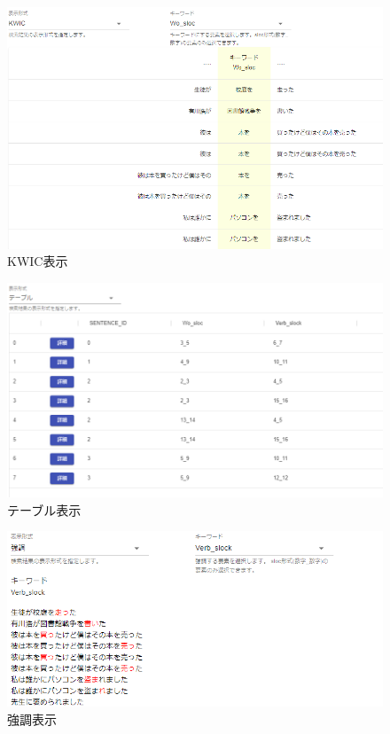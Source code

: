 \documentclass{FITpaper}
\begin{document}
\begin{figure}[htbp]
  \centering
  \includegraphics[scale=0.4]{fig/KWIC_result.png}
  \caption{KWIC表示}
  \label{fig:KWIC}
\end{figure}
\begin{figure}[htbp]
  \centering
  \includegraphics[scale=0.4]{fig/table_result.png}
  \caption{テーブル表示}
  \label{fig:table}
\end{figure}
\begin{figure}[htbp]
  \centering
  \includegraphics[scale=0.4]{fig/acsent_result.png}
  \caption{強調表示}
  \label{fig:acsent}
\end{figure}
\end{document}

